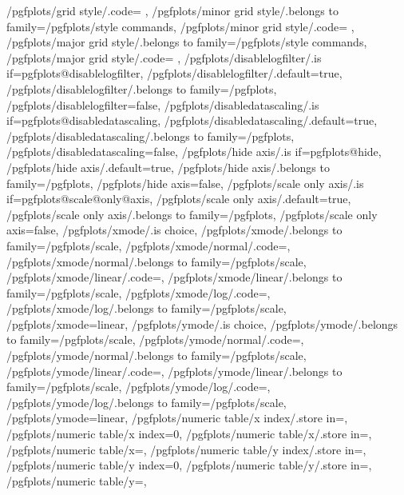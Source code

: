 {	/pgfplots/grid style/.code={%
	},
	/pgfplots/minor grid style/.belongs to family=/pgfplots/style commands,
	/pgfplots/minor grid style/.code={%
	},
	/pgfplots/major grid style/.belongs to family=/pgfplots/style commands,
	/pgfplots/major grid style/.code={%
	},
	/pgfplots/disablelogfilter/.is if=pgfplots@disablelogfilter,
	/pgfplots/disablelogfilter/.default=true,
	/pgfplots/disablelogfilter/.belongs to family=/pgfplots,
	/pgfplots/disablelogfilter=false,
	/pgfplots/disabledatascaling/.is if=pgfplots@disabledatascaling,
	/pgfplots/disabledatascaling/.default=true,
	/pgfplots/disabledatascaling/.belongs to family=/pgfplots,
	/pgfplots/disabledatascaling=false,
	/pgfplots/hide axis/.is if=pgfplots@hide,
	/pgfplots/hide axis/.default=true,
	/pgfplots/hide axis/.belongs to family=/pgfplots,
	/pgfplots/hide axis=false,
	/pgfplots/scale only axis/.is if=pgfplots@scale@only@axis,
	/pgfplots/scale only axis/.default=true,
	/pgfplots/scale only axis/.belongs to family=/pgfplots,
	/pgfplots/scale only axis=false,
	/pgfplots/xmode/.is choice,
	/pgfplots/xmode/.belongs to family=/pgfplots/scale,
	/pgfplots/xmode/normal/.code={},
	/pgfplots/xmode/normal/.belongs to family=/pgfplots/scale,
	/pgfplots/xmode/linear/.code={},
	/pgfplots/xmode/linear/.belongs to family=/pgfplots/scale,
	/pgfplots/xmode/log/.code={},
	/pgfplots/xmode/log/.belongs to family=/pgfplots/scale,
	/pgfplots/xmode=linear,
	/pgfplots/ymode/.is choice,
	/pgfplots/ymode/.belongs to family=/pgfplots/scale,
	/pgfplots/ymode/normal/.code={},
	/pgfplots/ymode/normal/.belongs to family=/pgfplots/scale,
	/pgfplots/ymode/linear/.code={},
	/pgfplots/ymode/linear/.belongs to family=/pgfplots/scale,
	/pgfplots/ymode/log/.code={},
	/pgfplots/ymode/log/.belongs to family=/pgfplots/scale,
	/pgfplots/ymode=linear,
	/pgfplots/numeric table/x index/.store in=\pgfplots@plot@tbl@xindex,
	/pgfplots/numeric table/x index=0,
	/pgfplots/numeric table/x/.store in=\pgfplots@plot@tbl@x,
	/pgfplots/numeric table/x=,
	/pgfplots/numeric table/y index/.store in=\pgfplots@plot@tbl@yindex,
	/pgfplots/numeric table/y index=0,
	/pgfplots/numeric table/y/.store in=\pgfplots@plot@tbl@y,
	/pgfplots/numeric table/y=,
}

